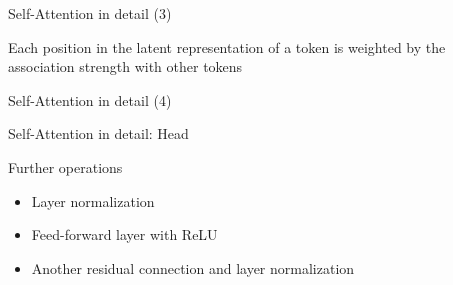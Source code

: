 \documentclass[12pt,aspectratio=169,handout]{beamer}
\begin{document}
\begin{frame}{Self-Attention in detail (3)}
	
	
	\begin{figure}
		\scalebox{0.75}{\hspace{-2cm}
			
		}
	\end{figure}
	
	
	Each position in the latent representation of a token is weighted by the association strength with other tokens
	
	
\end{frame}


\begin{frame}{Self-Attention in detail (4)}
	
	
	\begin{figure}
		\scalebox{0.75}{\hspace{-2cm}
			
		}
	\end{figure}
	
\end{frame}



\begin{frame}{Self-Attention in detail: Head}
	
	
	\begin{figure}
		\scalebox{0.75}{\hspace{-1.5cm}
			
		}
	\end{figure}
	
	Further operations
	
	\begin{itemize}
		\item Layer normalization
		\item Feed-forward layer with ReLU
		\item Another residual connection and layer normalization
	\end{itemize}
	
\end{frame}
\end{document}
